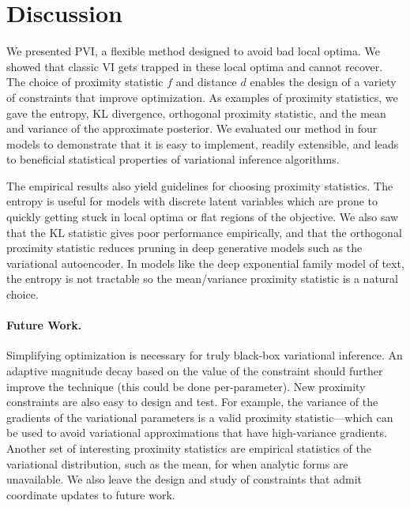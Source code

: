 \section{Discussion}
\label{sec:discussion}
We presented \acrlong{PVI}, a flexible method designed to avoid bad local optima. We showed that classic \acrlong{VI} gets trapped in these local optima and cannot recover. The choice of proximity statistic $f$ and distance $d$ enables the design of a variety of constraints that improve optimization. As examples of proximity statistics, we gave the entropy, \gls{KL} divergence, orthogonal proximity statistic, and the mean and variance of the approximate posterior. We evaluated our method in four models to demonstrate that it is easy to implement, readily extensible, and leads to beneficial statistical properties of variational inference algorithms.

The empirical results also yield guidelines for choosing proximity statistics. The entropy is useful for models with discrete latent variables which are prone to quickly getting stuck in local optima or flat regions of the objective. We also saw that the \gls{KL} statistic gives poor performance empirically, and that the orthogonal proximity statistic reduces pruning in deep generative models such as the variational autoencoder. In models like the deep exponential family model of text, the entropy is not tractable so the mean/variance proximity statistic is a natural choice.

\paragraph{Future Work.} Simplifying optimization is necessary for truly black-box variational inference. An adaptive magnitude decay based on the value of the constraint should further improve the technique (this could be done per-parameter). New proximity constraints are also easy to design and test. For example, the variance of the gradients of the variational parameters is a valid proximity statistic---which can be used to avoid variational approximations that have high-variance gradients. Another set of interesting proximity statistics are empirical statistics of the variational distribution, such as the mean, for when analytic forms are unavailable. We also leave the design and study of constraints that admit coordinate updates to future work.